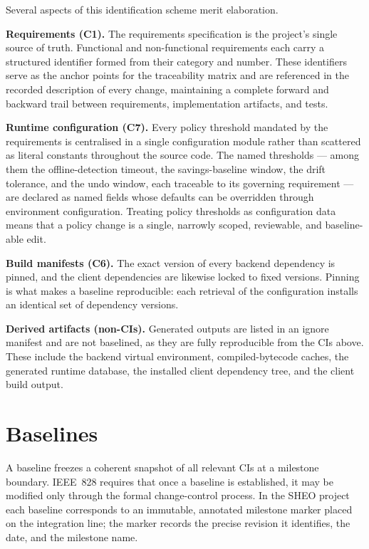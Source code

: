 Several aspects of this identification scheme merit elaboration.

\textbf{Requirements (C1).} The requirements specification is the project's single
source of truth. Functional and non-functional requirements each carry a structured
identifier formed from their category and number. These identifiers serve as the
anchor points for the traceability matrix and are referenced in the recorded
description of every change, maintaining a complete forward and backward trail
between requirements, implementation artifacts, and tests.

\textbf{Runtime configuration (C7).} Every policy threshold mandated by the
requirements is centralised in a single configuration module rather than scattered
as literal constants throughout the source code. The named thresholds --- among them
the offline-detection timeout, the savings-baseline window, the drift tolerance, and
the undo window, each traceable to its governing requirement --- are declared as
named fields whose defaults can be overridden through environment configuration.
Treating policy thresholds as configuration data means that a policy change is a
single, narrowly scoped, reviewable, and baseline-able edit.

\textbf{Build manifests (C6).} The exact version of every backend dependency is
pinned, and the client dependencies are likewise locked to fixed versions. Pinning is
what makes a baseline reproducible: each retrieval of the configuration installs an
identical set of dependency versions.

\textbf{Derived artifacts (non-CIs).} Generated outputs are listed in an ignore
manifest and are not baselined, as they are fully reproducible from the CIs above.
These include the backend virtual environment, compiled-bytecode caches, the
generated runtime database, the installed client dependency tree, and the client
build output.

\section{Baselines}
\label{sec:scm-baselines}

A baseline freezes a coherent snapshot of all relevant CIs at a milestone boundary.
IEEE~828 requires that once a baseline is established, it may be modified only
through the formal change-control process. In the SHEO project each baseline
corresponds to an immutable, annotated milestone marker placed on the integration
line; the marker records the precise revision it identifies, the date, and the
milestone name.

